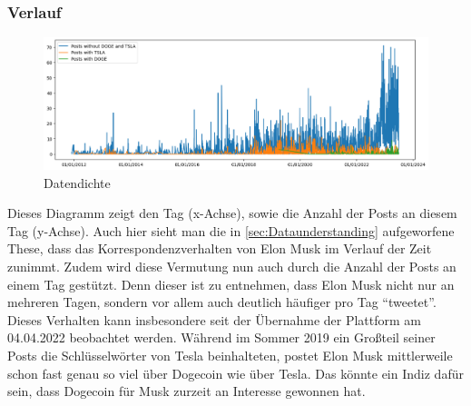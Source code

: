 \documentclass{article}
\begin{document}
\subsubsection{Verlauf}
\begin{figure}[!htb]
  	\includegraphics[width=\textwidth, center]{./imgs/Verlauf.png}
 	\caption{Datendichte}
 	\label{fig:Datendichte}
\end{figure}
Dieses Diagramm zeigt den Tag (x-Achse), sowie die Anzahl der Posts an diesem Tag (y-Achse). Auch hier sieht man die in \ref{sec:Dataunderstanding} aufgeworfene These, dass das Korrespondenzverhalten von Elon Musk im Verlauf der Zeit zunimmt.
Zudem wird diese Vermutung nun auch durch die Anzahl der Posts an einem Tag gestützt.
Denn dieser ist zu entnehmen, dass Elon Musk nicht nur an mehreren Tagen, sondern vor allem auch deutlich häufiger pro Tag ``tweetet''.
Dieses Verhalten kann insbesondere seit der Übernahme der Plattform am 04.04.2022 beobachtet werden.
Während im Sommer 2019 ein Großteil seiner Posts die Schlüsselwörter von Tesla beinhalteten, postet Elon Musk mittlerweile schon fast genau so viel über Dogecoin wie über Tesla. Das könnte ein Indiz dafür sein, dass Dogecoin für Musk zurzeit an Interesse gewonnen hat.
\end{document}
